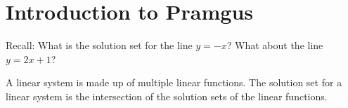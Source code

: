 \chapter{Introduction to Pramgus}

\begin{prblm}
Recall: What is the solution set for the line $y=-x$? What about the line $y=2x+1$?
\end{prblm}


\begin{defn}
	A linear system is made up of multiple linear functions. The solution set for a linear system is the intersection of the solution sets of the linear functions. 
\end{defn}

